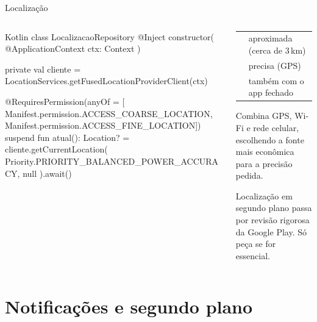 \documentclass[aspectratio=169,10pt]{beamer}
\begin{document}
\begin{frame}[fragile]{Localização}
  \begin{columns}[T]
    \begin{column}{0.54\textwidth}
\begin{codigo}[title=LocalizacaoRepository.kt]{Kotlin}
class LocalizacaoRepository @Inject constructor(
  @ApplicationContext ctx: Context
) {
  private val cliente =
    LocationServices.getFusedLocationProviderClient(ctx)

  @RequiresPermission(anyOf = [
    Manifest.permission.ACCESS_COARSE_LOCATION,
    Manifest.permission.ACCESS_FINE_LOCATION])
  suspend fun atual(): Location? =
    cliente.getCurrentLocation(
      Priority.PRIORITY_BALANCED_POWER_ACCURACY,
      null
    ).await()
}
\end{codigo}
    \end{column}
    \begin{column}{0.44\textwidth}
      \scriptsize
      \begin{tabularx}{\linewidth}{@{}l L@{}}
        \toprule
         &  \\
        \midrule
         & aproximada (cerca de 3\,km) \\
         & precisa (GPS) \\
         & também com o app fechado \\
        \bottomrule
      \end{tabularx}
      \begin{conceito}
        Combina GPS, Wi-Fi e rede celular, escolhendo a fonte mais econômica para a precisão pedida.
      \end{conceito}
      \begin{atencao}
        Localização em segundo plano passa por revisão rigorosa da Google Play. Só peça se for essencial.
      \end{atencao}
    \end{column}
  \end{columns}
\end{frame}

\section{Notificações e segundo plano}
\end{document}
